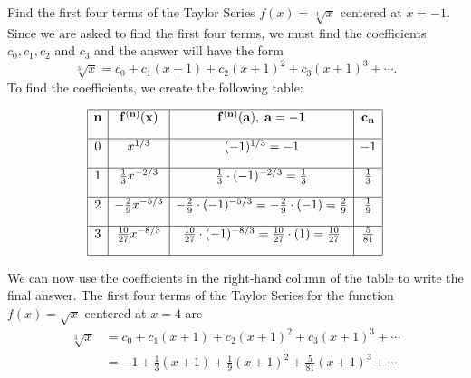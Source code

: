 \documentclass{ximera}
\begin{document}
\begin{example} Find the first four terms of the Taylor Series $f(x) = \sqrt[3] x$ centered at $x = -1$.\\
Since we are asked to find the first four terms, we must find the coefficients $c _0, c_1, c_2$ and $c_3$
and the answer will have the form 
\[
\sqrt[3] x = c_0 + c_1(x+1) + c_2(x+1)^2 + c_3(x+1)^3 + \cdots .
\]
To find the coefficients, we create the following table:

\[
\begin{array}{|c|c|c|c|} 
\hline
\bf{n} & \bf{f^{(n)}(x)} & \bf{f^{(n)}(a), \; a = -1} & \bf{c_n} \\[1em] 
\hline
 0 & x^{1/3} & (-1)^{1/3} = -1 & -1 \\[1em]
\hline
1 & \frac13 x^{-2/3} & \frac13 \cdot (-1)^{-2/3} = \frac13 & \frac13 \\[1em]
\hline
 2 & -\frac29 x^{-5/3} & -\frac29 \cdot (-1)^{-5/3} 
= -\frac29 \cdot (-1) = \frac29 & \frac{1}{9} \\[1em]
\hline
 3 & \frac{10}{27} x^{-8/3} & \frac{10}{27} \cdot (-1)^{-8/3} = \frac{10}{27} \cdot (1) = \frac{10}{27} & \frac{5}{81}\\[1em]
\hline
\end{array}
\]



We can now use the coefficients in the right-hand column of the table to write the final answer. 
The first four terms of the Taylor Series for the function $f(x) = \sqrt x$ centered at $x = 4$ are
\begin{align*}
\sqrt[3] x &= c_0 + c_1(x+1) + c_2(x+1)^2 + c_3(x+1)^3 + \cdots \\
        &= -1 + \frac13(x+1) + \frac{1}{9}(x+1)^2 + \frac{5}{81}(x+1)^3 + \cdots
\end{align*}

\end{example}
\end{document}
